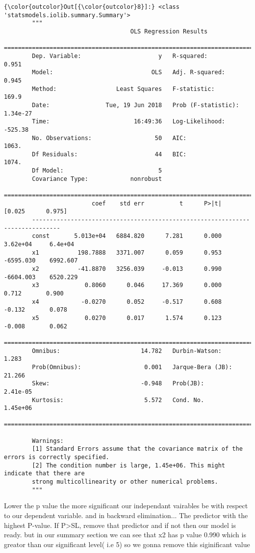 \documentclass[11pt]{article}
\begin{document}
\begin{Verbatim}[commandchars=\\\{\}]
{\color{outcolor}Out[{\color{outcolor}8}]:} <class 'statsmodels.iolib.summary.Summary'>
        """
                                    OLS Regression Results                            
        ==============================================================================
        Dep. Variable:                      y   R-squared:                       0.951
        Model:                            OLS   Adj. R-squared:                  0.945
        Method:                 Least Squares   F-statistic:                     169.9
        Date:                Tue, 19 Jun 2018   Prob (F-statistic):           1.34e-27
        Time:                        16:49:36   Log-Likelihood:                -525.38
        No. Observations:                  50   AIC:                             1063.
        Df Residuals:                      44   BIC:                             1074.
        Df Model:                           5                                         
        Covariance Type:            nonrobust                                         
        ==============================================================================
                         coef    std err          t      P>|t|      [0.025      0.975]
        ------------------------------------------------------------------------------
        const       5.013e+04   6884.820      7.281      0.000    3.62e+04     6.4e+04
        x1           198.7888   3371.007      0.059      0.953   -6595.030    6992.607
        x2           -41.8870   3256.039     -0.013      0.990   -6604.003    6520.229
        x3             0.8060      0.046     17.369      0.000       0.712       0.900
        x4            -0.0270      0.052     -0.517      0.608      -0.132       0.078
        x5             0.0270      0.017      1.574      0.123      -0.008       0.062
        ==============================================================================
        Omnibus:                       14.782   Durbin-Watson:                   1.283
        Prob(Omnibus):                  0.001   Jarque-Bera (JB):               21.266
        Skew:                          -0.948   Prob(JB):                     2.41e-05
        Kurtosis:                       5.572   Cond. No.                     1.45e+06
        ==============================================================================
        
        Warnings:
        [1] Standard Errors assume that the covariance matrix of the errors is correctly specified.
        [2] The condition number is large, 1.45e+06. This might indicate that there are
        strong multicollinearity or other numerical problems.
        """
\end{Verbatim}
                  Lower the p value the more significant our independant vairables be with respect to our dependent variable.
    and in backward elimination... The predictor with the highest P-value. If P>SL, remove that predictor and if 
    not then our model is ready.
    but in our summary section we can see that x2 has p value 0.990 which is greator than our significant  level(
    i.e 5) so we gonna remove this siginificant value
\end{document}
